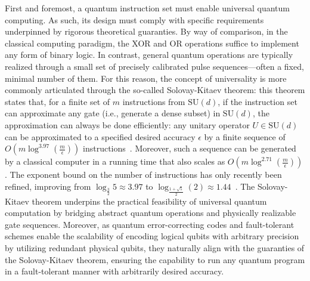 \documentclass[a4paper,onecolumn,11pt,unpublished]{quantumarticle}
\begin{document}
First and foremost, a quantum instruction set must enable universal quantum computing. As such, its design must comply with specific requirements underpinned by rigorous theoretical guaranties. By way of comparison, in the classical computing paradigm, the XOR and OR operations suffice to implement any form of binary logic. In contrast, general quantum operations are typically realized through a small set of precisely calibrated pulse sequences---often a fixed, minimal number of them.
For this reason, the concept of universality is more commonly articulated through the so-called Solovay-Kitaev theorem: this theorem states that, for a finite set of $m$ instructions from $\mathrm{SU}(d)$, if the instruction set can approximate any gate (i.e., generate a dense subset) in $\mathrm{SU}(d)$, the approximation can always be done efficiently: any unitary operator $U \in \mathrm{SU}(d)$ can be approximated to a specified desired accuracy $\epsilon$ by a finite sequence of $O\left(m\log^{3.97}\left(\frac{m}{\epsilon}\right)\right)$ instructions~\cite{dawson2005solovay}. Moreover, such a sequence can be generated by a classical computer in a running time that also scales as $O\left(m\log^{2.71}\left(\frac{m}{\epsilon}\right)\right)$. The exponent bound on the number of instructions has only recently been refined, improving from $\log_{\frac{3}{2}} 5 \approx 3.97$ to $\log_{\frac{1+\sqrt{5}}{2}} (2) \approx 1.44$~\cite{kuperberg2023breaking}.
The Solovay-Kitaev theorem underpins the practical feasibility of universal quantum computation by bridging abstract quantum operations and physically realizable gate sequences. Moreover, as quantum error-correcting codes and fault-tolerant schemes enable the scalability of encoding logical qubits with arbitrary precision by utilizing redundant physical qubits, they naturally align with the guaranties of the Solovay-Kitaev theorem, ensuring the capability to run any quantum program in a fault-tolerant manner with arbitrarily desired accuracy. 
\end{document}
